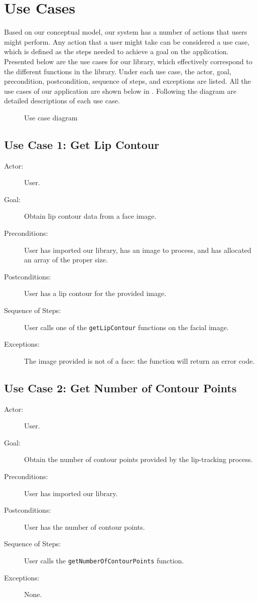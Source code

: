 \chapter{Use Cases}
Based on our conceptual model, our system has a number of actions that users might perform. Any action that a user might take can be considered a use case, which is defined as the steps needed to achieve a goal on the application. Presented below are the use cases for our library, which effectively correspond to the different functions in the library. Under each use case, the actor, goal, precondition, postcondition, sequence of steps, and exceptions are listed. All the use cases of our application are shown below in . Following the diagram are detailed descriptions of each use case.


\begin{figure}[!h]
\noindent\centering\resizebox{0.8\textwidth}{!}{
  
}
\caption{Use case diagram}
\label{fig:use-cases}
\end{figure}

\section{Use Case 1: Get Lip Contour}

\begin{description}
  \item[Actor:] User.
  \item[Goal:] Obtain lip contour data from a face image.
  \item[Preconditions:] User has imported our library, has an image to process, and has allocated an array of the proper size.
  \item[Postconditions:] User has a lip contour for the provided image.
  \item[Sequence of Steps:] User calls one of the \texttt{getLipContour} functions on the facial image.
  \item[Exceptions:] The image provided is not of a face: the function will return an error code.
\end{description}


\section{Use Case 2: Get Number of Contour Points}

\begin{description}
	\item[Actor:] User.
	\item[Goal:] Obtain the number of contour points provided by the lip-tracking process.
	\item[Preconditions:] User has imported our library.
	\item[Postconditions:] User has the number of contour points.
	\item[Sequence of Steps:] User calls the \texttt{getNumberOfContourPoints} function.
	\item[Exceptions:] None.
\end{description}


